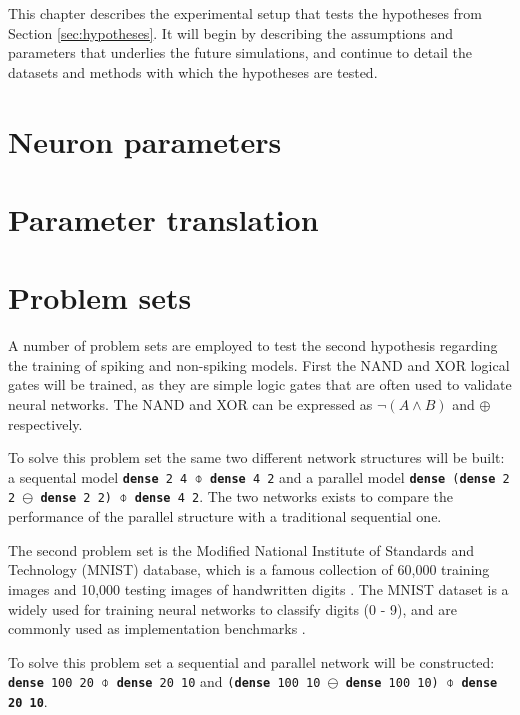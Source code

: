 \documentclass[report.tex]{subfiles}
\begin{document}
This chapter describes the experimental setup that tests the hypotheses
from Section \ref{sec:hypotheses}.
It will begin by describing the assumptions and parameters that underlies the
future simulations, and continue to detail the datasets and methods with which
the hypotheses are tested.

\section{Neuron parameters}


\section{Parameter translation}


\section{Problem sets}
A number of problem sets are employed to test the second hypothesis regarding the training of 
spiking and non-spiking models.
First the NAND and XOR logical gates will be trained, as they are simple logic gates
that are often used to validate neural networks.
The NAND and XOR can be expressed as $\neg(A \land B)$ and $\oplus$ respectively.

To solve this problem set the same two different network structures will be built: a sequental
model
\texttt{\textbf{dense} 2 4 $\obar$ \textbf{dense} 4 2} and a parallel model
\texttt{\textbf{dense} (\textbf{dense} 2 2 $\ominus$ \textbf{dense} 2 2) $\obar$ \textbf{dense} 4 2}.
The two networks exists to compare the performance of the parallel structure with 
a traditional sequential one.

The second problem set is the Modified National Institute of Standards and Technology
(MNIST) database, which is a famous collection of 60,000 training images
and 10,000 testing images of handwritten digits \cite{LeCun1998}.
The MNIST dataset is a widely used for training neural networks to classify digits (0 - 9),
and are commonly used as implementation benchmarks \cite{Schmidhuber2014, Schmitt2017}.

To solve this problem set a sequential and parallel network will be constructed:
\texttt{\textbf{dense} 100 20 $\obar$ \textbf{dense} 20 10} and
\texttt{(\textbf{dense} 100 10 $\ominus$ \textbf{dense} 100 10) $\obar$ \textbf{dense 20 10}}.
\end{document}
